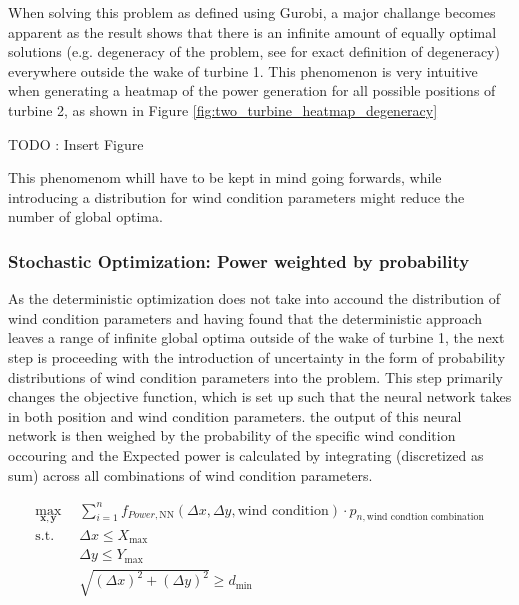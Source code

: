 When solving this problem as defined using Gurobi, a major challange becomes apparent as the result shows that there is an infinite amount of equally optimal solutions (e.g. degeneracy of the problem, see  \cite{vanderbei2020chapter3} for exact definition of degeneracy) everywhere outside the wake of turbine 1. This phenomenon is very intuitive when generating a heatmap of the power generation for all possible positions of turbine 2, as shown in Figure \ref{fig:two_turbine_heatmap_degeneracy}

TODO :  Insert Figure


This phenomenom whill have to be kept in mind going forwards, while introducing a distribution for wind condition parameters might reduce the number of global optima. 


\subsubsection{Stochastic Optimization:  Power weighted by probability}

As the deterministic optimization does not take into accound the distribution of wind condition parameters and having found that the deterministic approach leaves a range of infinite global optima outside of the wake of turbine 1, the next step is proceeding with the introduction of uncertainty in the form of probability distributions of wind condition parameters into the problem. This step primarily changes the objective function, which is set up such that the neural network takes in both position and wind condition parameters. the output of this neural network is then weighed by the probability of the specific wind condition occouring and the Expected power is calculated by integrating (discretized as sum) across all combinations of wind condition parameters.

\begin{align}
	\max_{\mathbf{x}, \mathbf{y}} &  \sum_{i=1}^{n} f_{Power,\text{NN}}(\Delta x, \Delta y, \text{wind condition})\cdot p_{n,\text{wind condtion combination}} \\
	\text{s.t.} \quad 
	&  \Delta x \leq X_{\max} \\
	&  \Delta y \leq Y_{\max} \\
	& \sqrt{(\Delta x)^2 + (\Delta y)^2} \geq d_{\min}
\end{align}

